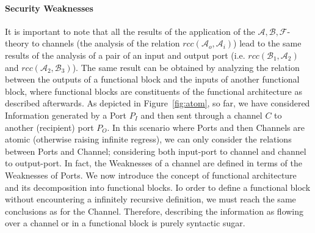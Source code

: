 \documentclass[conference]{IEEEtran}
\newcommand{\assertionRegion}{\mathcal{A}}
\newcommand{\beliefRegion}{\mathcal{B}}
\newcommand{\factRegion}{\mathcal{F}}
\newcommand{\abf}{\assertionRegion,\beliefRegion,\factRegion}
\newcommand{\Rcc}[2]{rcc(#1,#2)}
\begin{document}
\paragraph{Security Weaknesses} 
It is important to note that all the results of the application of the
$\abf$-theory to channels (the analysis of the relation
$\Rcc{\assertionRegion_o}{\assertionRegion_i}$) lead to the same results of the
analysis of a pair of an input and output port (i.e.
$\Rcc{\beliefRegion_1}{\assertionRegion_2}$ and
$\Rcc{\assertionRegion_2}{\beliefRegion_3}$).  The same result can be obtained
by analyzing the relation between the outputs of a functional block and the
inputs of another functional block, where functional blocks are constituents of
the functional architecture as described afterwards.  As depicted in
Figure~\ref{fig:atom}, so far, we have considered Information generated by a
Port $P_I$ and then sent through a channel $C$ to another (recipient) port
$P_O$. In this scenario where Ports and then Channels are atomic (otherwise
raising infinite regress), we can only  consider the relations between Ports
and Channel; considering both input-port to channel and channel to output-port.
In fact, the Weaknesses of a channel are defined in terms of the Weaknesses of
Ports. We now introduce the concept of functional architecture and its
decomposition into functional blocks.  Io order to define a functional block
without encountering a infinitely recursive definition, we must reach the same
conclusions as for the Channel. Therefore, describing the information as
flowing over a channel or in a functional block is purely syntactic sugar.
\end{document}
